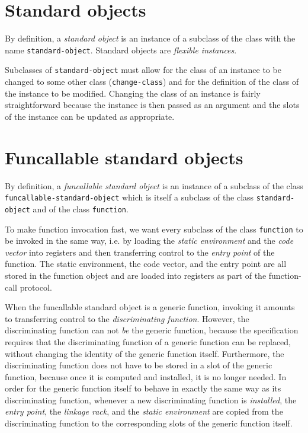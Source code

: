 \section{Standard objects}
\label{sec-data-representation-standard-objects}

By definition, a \emph{standard object} is an instance of a subclass
of the class with the name \texttt{standard-object}.  Standard objects
are \emph{flexible instances}.

Subclasses of \texttt{standard-object} must allow for the class of an
instance to be changed to some other class (\texttt{change-class}) and
for the definition of the class of the instance to be modified.
Changing the class of an instance is fairly straightforward because
the instance is then passed as an argument and the slots of the
instance can be updated as appropriate.


\section{Funcallable standard objects}
\label{sec-data-representation-funcallable-standard-objects}

By definition, a \emph{funcallable standard object} is an instance of
a subclass of the class \texttt{funcallable-standard-object} which is
itself a subclass of the class \texttt{standard-object}
 and of the class
\texttt{function}. 

To make function invocation fast, we want every subclass of the class
\texttt{function} to be invoked in the same way, i.e. by loading the
\emph{static environment} and the \emph{code vector} into registers
and then transferring control to the \emph{entry point} of the
function. The static environment, the code vector, and the entry point
are all stored in the function object and are loaded into registers as
part of the function-call protocol.

When the funcallable standard object is a generic function, invoking
it amounts to transferring control to the \emph{discriminating
  function}.  However, the discriminating function can not \emph{be}
the generic function, because the \clos{} specification requires that
the discriminating function of a generic function can be replaced,
without changing the identity of the generic function itself.
Furthermore, the discriminating function does not have to be stored in
a slot of the generic function, because once it is computed and
installed, it is no longer needed.  In order for the generic function
itself to behave in exactly the same way as its discriminating
function, whenever a new discriminating function is \emph{installed},
the \emph{entry point}, the \emph{linkage rack}, and the
\emph{static environment} are copied from the discriminating function
to the corresponding slots of the generic function itself.

